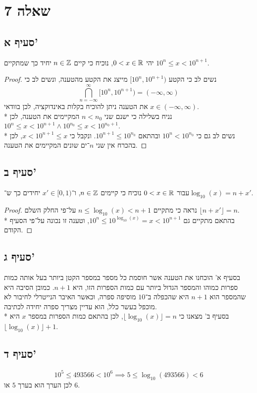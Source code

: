 \section{שאלה 7}
\subsection{סעיף א'}
יהי $0 < x \in \mathbb{R}$, נוכיח כי קיים $n \in \mathbb{Z}$ יחיד כך שמתקיים $10^n \le x < 10^{n + 1}$.
\begin{proof}
	נשים לב כי הקטע $[10^n, 10^{n + 1})$ מייצג את הקטע מהטענה, ונשים לב כי %
	\[
		\bigcap_{n = -\infty}^{\infty} [10^n, 10^{n + 1}) = (-\infty, \infty) %
	\]
	את הטענה ניתן להוכיח בקלות באינדוקציה, לכן בוודאי $x \in (-\infty, \infty)$. \\*
	נניח בשלילה כי ישנם שני $n < n_0$ המקיימים את הטענה, לכן $10^n \le x < 10^{n + 1} \land 10^{n_0} \le x < 10^{n_0 + 1}$. \\*
	נשים לב גם כי $10^n < 10^{n_0}$ ובהתאם $10^{n + 1} \le 10^{n_0}$. ונקבל כי $x < 10^{n + 1} \le x$, לכן בהכרח אין שני $n$־ים שונים המקיימים את הטענה.
\end{proof}

\subsection{סעיף ב'}
עבור $0 < x \in \mathbb{R}$ נוכיח כי קיימים $n \in \mathbb{Z}$, ו־$x' \in [0, 1)$ יחידים כך ש־$\log_{10}(x) = n + x'$. %
\begin{proof}
	נראה כי מתקיים $n \le \log_{10}(x) < n + 1$ על־פי החלק השלם $\lfloor n + x' \rfloor = n$. \\*
	בהתאם מתקיים גם $10^n \le 10^{\log_{10}(x)} = x < 10^{n + 1}$, וטענה זו נכונה על־פי הסעיף הקודם.
\end{proof}

\subsection{סעיף ג'}
בסעיף א' הוכחנו את הטענה אשר חוסמת כל מספר במספר הקטן ביותר בעל אותה כמות ספרות כמוהו והמספר הגדול ביותר עם כמות הספרות הזו, היא $n + 1$.
כמובן הסיבה היא שהמספר הוא $n + 1$ היא שהכפלה ב־$10$ מוסיפה ספרה, וכאשר האיבר הנייטרלי לחיבור לא מוכפל בעשר כלל, הוא עדיין מצריך ספרה יחידה לכתיבה. \\*
בסעיף ב' מצאנו כי $\lfloor \log_{10}(x) \rfloor = n$, לכן בהתאם כמות הספרות במספר $x$ היא $\lfloor \log_{10}(x) \rfloor + 1$.

\subsection{סעיף ד'}
\[
	10^5 \le 493566 < 10^6 \implies 5 \le \log_{10}(493566) < 6
\]
לכן הערך הוא בערך $5$ או $6$.

